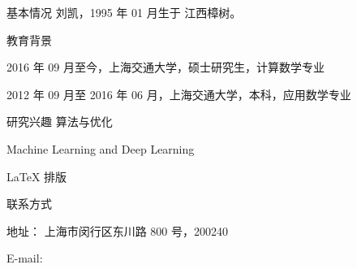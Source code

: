 \begin{resume}
  \begin{resumesection}{基本情况}
    刘凯，1995 年 01 月生于 江西樟树。
  \end{resumesection}

  \begin{resumelist}{教育背景}
    \item 2016 年 09 月至今，上海交通大学，硕士研究生，计算数学专业
    \item 2012 年 09 月至 2016 年 06 月，上海交通大学，本科，应用数学专业
  \end{resumelist}

  \begin{resumesection}{研究兴趣}
    算法与优化
    \item Machine Learning and Deep Learning
    \item \LaTeX{} 排版
  \end{resumesection}

  \begin{resumelist}{联系方式}
    \item 地址： 上海市闵行区东川路 800 号，200240
    \item E-mail: 
  \end{resumelist}
\end{resume}
